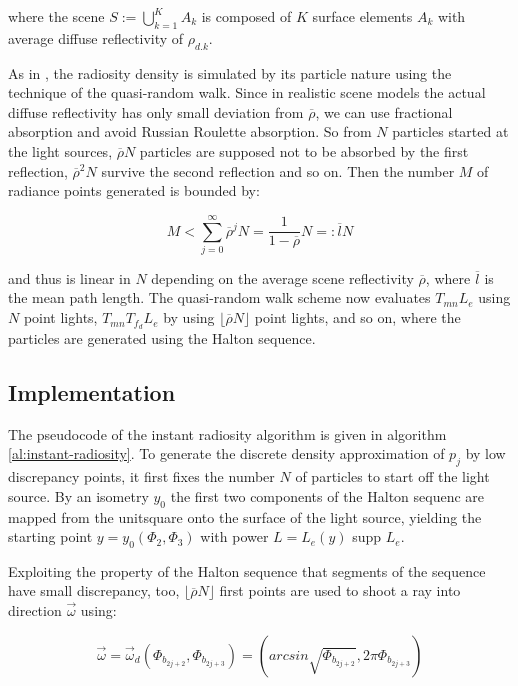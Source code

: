 where the scene $S:=\bigcup^{K}_{k=1}A_k$ is composed of $K$ surface elements $A_k$ with average diffuse reflectivity of $\rho_{d.k}$.

As in \cite{a:Quasi-MonteCarloRadiosity}, the radiosity density is simulated by its particle nature using the technique of the quasi-random walk. Since in realistic scene models the actual diffuse reflectivity has only small deviation from $\overline{\rho}$, we can use fractional absorption and avoid Russian Roulette absorption. So from $N$ particles started at the light sources, $\overline{\rho}N$ particles are supposed not to be absorbed by the first reflection, $\overline{\rho}^{2}N$ survive the second reflection and so on. Then the number $M$ of radiance points generated is bounded by:

\begin{equation*}
	M<\sum^{\infty}_{j=0}\overline{\rho}^{j}N=\frac{1}{1-\overline{\rho}}N=:\overline{l}N
\end{equation*}

and thus is linear in $N$ depending on the average scene reflectivity $\overline{\rho}$, where $\overline{l}$ is the mean path length. The quasi-random walk scheme now evaluates $T_{mn}L_e$ using $N$ point lights, $T_{mn}T_{f_d}L_e$ by using $\lfloor\overline{\rho}N\rfloor$ point lights, and so on, where the particles are generated using the Halton sequence. 



\subsection{Implementation}
The pseudocode of the instant radiosity algorithm is given in algorithm \ref{al:instant-radiosity}. To generate the discrete density approximation of $p_j$ by low discrepancy points, it first fixes the number $N$ of particles to start off the light source. By an isometry $y_0$ the first two components of the Halton sequenc are mapped from the unitsquare onto the surface of the light source, yielding the starting point $y=y_0(\Phi_2,\Phi_3)$ with power $L=L_e(y)$ supp $L_e$.

Exploiting the property of the Halton sequence that segments of the sequence have small discrepancy, too, $\lfloor\overline{\rho}N\rfloor$ first points are used to shoot a ray into direction $\vec{\omega}$ using:

\begin{equation*}
	\vec{\omega}=\vec{\omega}_d(\Phi_{b_{2j+2}},\Phi_{b_{2j+3}})=(arcsin\sqrt{\Phi_{b_{2j+2}}},2\pi\Phi_{b_{2j+3}})
\end{equation*}

